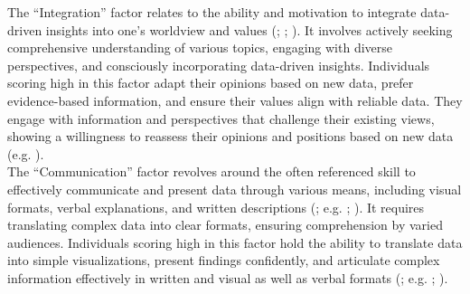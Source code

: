 \documentclass[
  12pt,
  a4paper,
  twoside]{article}
\begin{document}
The ``Integration'' factor relates to the ability and motivation to integrate data-driven insights into one's worldview and values (; ; ). It involves actively seeking comprehensive understanding of various topics, engaging with diverse perspectives, and consciously incorporating data-driven insights. Individuals scoring high in this factor adapt their opinions based on new data, prefer evidence-based information, and ensure their values align with reliable data. They engage with information and perspectives that challenge their existing views, showing a willingness to reassess their opinions and positions based on new data (e.g. ).\\
The ``Communication'' factor revolves around the often referenced skill to effectively communicate and present data through various means, including visual formats, verbal explanations, and written descriptions (; e.g. ; ).
It requires translating complex data into clear formats, ensuring comprehension by varied audiences. Individuals scoring high in this factor hold the ability to translate data into simple visualizations, present findings confidently, and articulate complex information effectively in written and visual as well as verbal formats (; e.g. ; ).
\end{document}
